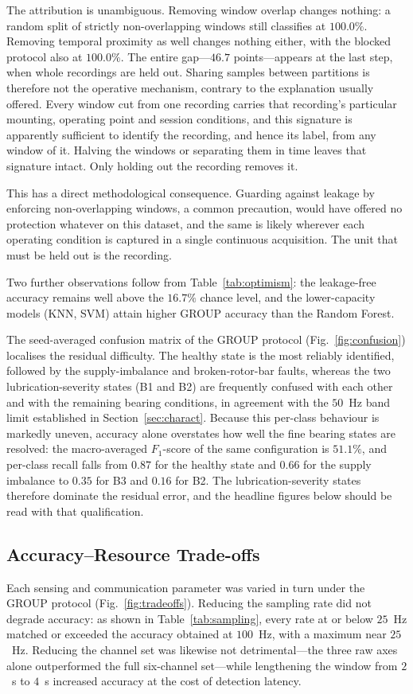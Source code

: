 The attribution is unambiguous. Removing window overlap changes nothing: a random
split of strictly non-overlapping windows still classifies at $100.0\%$. Removing
temporal proximity as well changes nothing either, with the blocked protocol also
at $100.0\%$. The entire gap---$46.7$ points---appears at the last step, when
whole recordings are held out. Sharing samples between partitions is therefore not
the operative mechanism, contrary to the explanation usually offered. Every window
cut from one recording carries that recording's particular mounting, operating
point and session conditions, and this signature is apparently sufficient to
identify the recording, and hence its label, from any window of it. Halving the
windows or separating them in time leaves that signature intact. Only holding out
the recording removes it.

This has a direct methodological consequence. Guarding against leakage by
enforcing non-overlapping windows, a common precaution, would have offered no
protection whatever on this dataset, and the same is likely wherever each
operating condition is captured in a single continuous acquisition. The unit that
must be held out is the recording.

Two further observations follow from Table~\ref{tab:optimism}: the leakage-free
accuracy remains well above the $16.7\%$ chance level, and the lower-capacity
models (KNN, SVM) attain higher GROUP accuracy than the Random Forest.

The seed-averaged confusion matrix of the GROUP protocol
(Fig.~\ref{fig:confusion}) localises the residual difficulty. The healthy state
is the most reliably identified, followed by the supply-imbalance and
broken-rotor-bar faults, whereas the two lubrication-severity states (B1 and B2)
are frequently confused with each other and with the remaining bearing
conditions, in agreement with the $50$~Hz band limit established in
Section~\ref{sec:charact}. Because this per-class behaviour is markedly uneven,
accuracy alone overstates how well the fine bearing states are resolved: the
macro-averaged $F_1$-score of the same configuration is $51.1\%$, and per-class
recall falls from $0.87$ for the healthy state and $0.66$ for the supply
imbalance to $0.35$ for B3 and $0.16$ for B2. The lubrication-severity states
therefore dominate the residual error, and the headline figures below should be
read with that qualification.

\subsection{Accuracy--Resource Trade-offs}
\label{subsec:tradeoff}
Each sensing and communication parameter was varied in turn under the GROUP
protocol (Fig.~\ref{fig:tradeoffs}). Reducing the sampling rate did not degrade
accuracy: as shown in Table~\ref{tab:sampling}, every rate at or below $25$~Hz
matched or exceeded the accuracy obtained at $100$~Hz, with a maximum near
$25$~Hz. Reducing the channel set was likewise not detrimental---the three raw
axes alone outperformed the full six-channel set---while lengthening the window
from $2$~s to $4$~s increased accuracy at the cost of detection latency.

